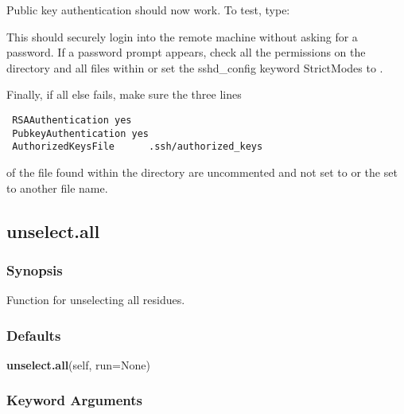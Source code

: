  Public key authentication should now work.  To test, type: 
  


 This should securely login into the remote machine without asking for a password.  If a password prompt appears, check all the permissions on the directory  and all files within or set the sshd\_config keyword StrictModes to . 
  




 Finally, if all else fails, make sure the three lines 
  

 {\footnotesize \begin{verbatim} 
 RSAAuthentication yes 
 PubkeyAuthentication yes 
 AuthorizedKeysFile      .ssh/authorized_keys 
 \end{verbatim}} 

 of the file  found within the directory  are uncommented and not set to  or the  set to another file name. 
  

  

 \newpage 

 \subsection{unselect.all} 

  
 \subsubsection{Synopsis} 

 Function for unselecting all residues. 
  

  
 \subsubsection{Defaults} 

 \textsf{\textbf{unselect.all}(self, run=None)} 

  
 \subsubsection{Keyword Arguments} 

